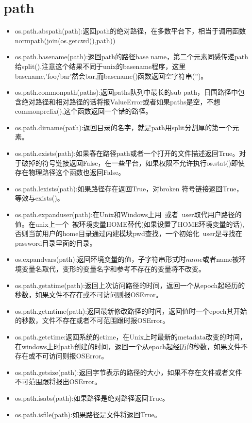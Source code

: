 \section{path}
\begin{itemize}
\item os.path.abspath(path):返回path的绝对路径，在多数平台下，相当于调用函数normpath(join(os.getcwd(),path))
\item os.path.basename(path):返回path的路径base name，第二个元素同感传递path给split(),注意这个结果不同于unix的basename程序，这里basename,'foo/bar'然会bar,而basename()函数返回空字符串('')。
\item os.path.commonpath(paths):返回paths队列中最长的sub-path，日国路径中包含绝对路径和相对路径的话将报ValueError或者如果paths是空，不想commonprefix(),这个函数返回一个错的路径。
\item os.path.dirname(path):返回目录的名字，就是path用split分割厚的第一个元素。
\item os.path.exists(path):如果春在路径path或者一个打开的文件描述返回True。对于破掉的符号链接返回False，在一些平台，如果权限不允许执行os.stat()即使存在物理路径这个函数也返回False。
\item os.path.lexists(path):如果路径存在返回True，对broken 符号链接返回True，等效与exists()。
\item os.path.expanduser(path):在Unix和Windows上用~或者~user取代用户路径的值。在unix上一个~被环境变量HOME替代(如果设置了HOME环境变量的话),否则当前用户的home目录通过内建模块pwd查找，一个初始化~user是寻找在password目录里面的目录。\item os.expandvars(path):返回环境变量的值，子字符串形式时${name}或者$name被环境变量名取代，变形的变量名字和参考不存在的变量将不改变。
\item os.path.getatime(path):返回上次访问路径的时间，返回一个从epoch起经历的秒数，如果文件不存在或不可访问则报OSError。
\item os.path.getmtime(path):返回最新修改路径的时间，返回值时一个epoch其开始的秒数，文件不存在或者不可范围跟时报OSError。
\item os.path.getctime:返回系统的ctime，在Unix上时最新的metadata改变的时间，在windows上时path创建的时间，返回一个从epoch起经历的秒数，如果文件不存在或不可访问则报OSError。
\item os.path.getsize(path):返回字节表示的路径的大小，如果不存在文件或者文件不可范围跟将报出OSError。
\item os.path.isabs(path):如果路径是绝对路径返回True。
\item os.path.isfile(path):如果路径是文件将返回True。

\end{itemize}

